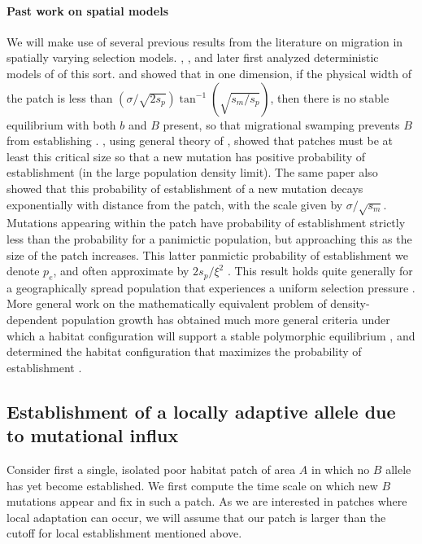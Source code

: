 \documentclass{article}
\begin{document}
\paragraph{Past work on spatial models}
We will make use of several previous results from the literature on
migration in spatially varying selection models. 
\citet{haldane1948theory}, \citet{fisher1950frequencies}, and later \citet{slatkin1973geneflow} first analyzed
deterministic models of of this sort.
\citet{nagylaki1975conditions} and \citet{conley1975application} showed that in one dimension, if the physical width of the patch is less than $(\sigma/\sqrt{2s_p}) \tan^{-1} (\sqrt{s_m/s_p})$, 
then there is no stable equilibrium with both $b$ and $B$ present,  %
so that migrational swamping prevents $B$ from establishing \citep[see also][ for a review]{lenormand2002limits}.
\citet{barton1987establishment}, using general theory of \citet{pollak1966survival}, showed  
that patches must be at least this critical size so that a new mutation has positive probability of establishment
(in the large population density limit).
The same paper also showed that
this probability of establishment of a new mutation decays exponentially with distance from the patch, 
with the scale given by $\sigma/\sqrt{s_m}$. Mutations appearing within the patch have probability of establishment
strictly less than the probability for a panimictic population,
but approaching this as the size of the patch increases.
This latter panmictic probability of establishment we denote $p_e$,
and often approximate by $2 s_p / \xi^2$ \citep{haldane1927mathematical,fisher1930genetical}.
This result holds quite generally for a geographically spread population that experiences a uniform selection
pressure \citep{maruyama1970fixation,cherry2003diffusion}. 
More general work on the mathematically equivalent problem of density-dependent population growth 
has obtained much more general criteria
under which a habitat configuration will support a stable polymorphic equilibrium \citep{cantrell1989diffusive},
and determined the habitat configuration that maximizes the probability of establishment \citep{lou2006minimization}.


\subsection{Establishment of a locally adaptive allele due to mutational influx}
\label{ss:patchymutation}

Consider first a single, isolated poor habitat patch of area $A$ in which no $B$ allele has yet become established. 
We first compute the time scale on which new $B$ mutations appear and fix in such a patch.
As we are interested in patches where local adaptation can occur,
we will assume that our patch is larger than the cutoff for local establishment 
mentioned above.
\end{document}
